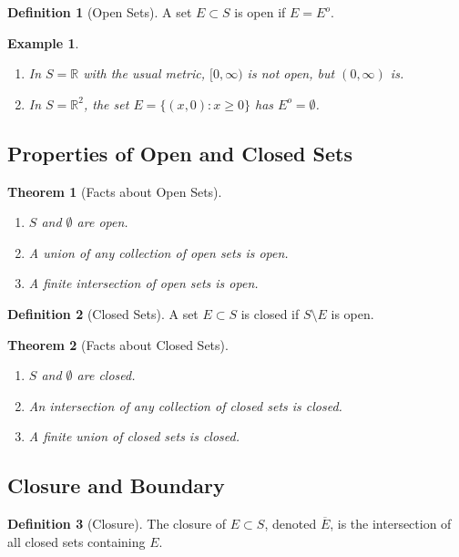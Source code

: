 \documentclass[9pt]{article}
\theoremstyle{definition}
\newtheorem{definition}{Definition}
\theoremstyle{plain}
\newtheorem{theorem}{Theorem}
\newtheorem{example}{Example}
\begin{document}
\begin{definition}[Open Sets]
A set $ E \subset S $ is open if $ E = E^o $.
\end{definition}

\begin{example}

\begin{enumerate}
    \item In $ S = \mathbb{R} $ with the usual metric, $ [0, \infty) $ is not open, but $ (0, \infty) $ is.
    \item In $ S = \mathbb{R}^2 $, the set $ E = \{(x, 0) : x \geq 0\} $ has $ E^o = \emptyset $.
\end{enumerate}
\end{example}

\subsection*{Properties of Open and Closed Sets}
\begin{theorem}[Facts about Open Sets]

\begin{enumerate}
    \item $ S $ and $ \emptyset $ are open.
    \item A union of any collection of open sets is open.
    \item A finite intersection of open sets is open.
\end{enumerate}
\end{theorem}

\begin{definition}[Closed Sets]
A set $ E \subset S $ is closed if $ S \setminus E $ is open.
\end{definition}

\begin{theorem}[Facts about Closed Sets]

\begin{enumerate}
    \item $ S $ and $ \emptyset $ are closed.
    \item An intersection of any collection of closed sets is closed.
    \item A finite union of closed sets is closed.
\end{enumerate}
\end{theorem}

\subsection*{Closure and Boundary}
\begin{definition}[Closure]
The closure of $ E \subset S $, denoted $ \overline{E} $, is the intersection of all closed sets containing $ E $.
\end{definition}
\end{document}
